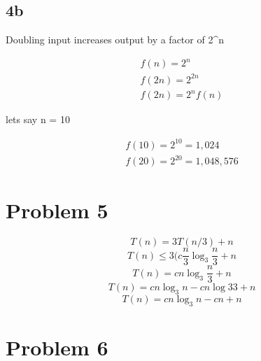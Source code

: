 \documentclass[letterpaper,oneside,10pt]{article}
\begin{document}
\subsection{4b}
\label{sec:4b}
\begin{center}
Doubling input increases output by a factor of 2^{n}
\end{center}
\begin{gather*}
f(n) = 2^n \\
f(2n) = 2^{2n} \\
f(2n) = 2^nf(n)
\end{gather*}
\begin{center}
lets say n = 10
\end{center}
\begin{gather*}
f(10) = 2^{10} = 1,024 \\
f(20) = 2^{20} = 1,048,576
\end{gather*}


\section{Problem 5}
\label{sec:Problem 5}
\begin{equation*}

\end{equation*}
\begin{equation*}
T(n)=3T(n/3)+n
\end{equation*}
\begin{equation*}
T(n)\leq 3(c\frac{n}{3}\log_{3}\frac{n}{3}+n
\end{equation*}
\begin{equation*}
T(n) = cn\log_{3}\frac{n}{3}+n
\end{equation*}
\begin{equation*}
T(n) = cn\log_{3}n-cn\log{3}3+n
\end{equation*}
\begin{equation*}
T(n) = cn\log_{3}n-cn+n
\end{equation*}

\section{Problem 6}
\label{sec:Problem 6}
\end{document}
